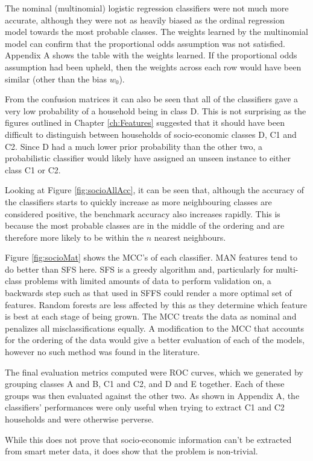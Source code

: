 The nominal (multinomial) logistic regression classifiers were not much more accurate, although they were not as heavily biased as the ordinal regression model towards the most probable classes. The weights learned by the multinomial model can confirm that  the proportional odds assumption was not satisfied.   Appendix A shows the table with the weights learned.  If the proportional odds assumption had been upheld, then the weights across each row would have been similar (other than the bias $w_0$).
\socioConf

From the confusion matrices it can also be seen that all of the classifiers gave a very low probability of a household being in class D. This is not surprising as the figures outlined in Chapter \ref{ch:Features} suggested that it should have been difficult to distinguish between households of socio-economic classes D, C1 and C2. Since D had a much lower prior probability than the other two, a probabilistic classifier would likely have assigned an unseen instance to either class C1 or C2.

Looking at Figure \ref{fig:socioAllAcc}, it can be seen that, although the accuracy of the classifiers starts to quickly increase as more neighbouring classes are considered positive, the benchmark accuracy also increases rapidly. This is because the most probable classes are in the middle of the ordering and are therefore more likely to be within the $n$ nearest neighbours.


\socioAllAcc

\socioMat

Figure \ref{fig:socioMat} shows the MCC's of each classifier. MAN features tend to do better than SFS here. SFS is a greedy algorithm and, particularly for multi-class problems with limited amounts of data to perform validation on,  a backwards step such as that used in SFFS could render a more optimal set of features. Random forests are less affected by this as they determine which feature is best at each stage of being grown. The MCC treats the data as nominal and penalizes all misclassifications equally. A modification to the MCC that accounts for the ordering of the data would give a better evaluation of each of the models, however no such method was found in the literature.  

The final evaluation metrics computed were ROC curves, which we generated by grouping classes A and B, C1 and C2, and D and E together.  Each of these groups was then evaluated against the other two.  As shown in Appendix A, the classifiers' performances were only useful when trying to extract C1 and C2 households and were otherwise perverse.

While this does not prove that socio-economic information can't be extracted from smart meter data, it does show that the problem is non-trivial.